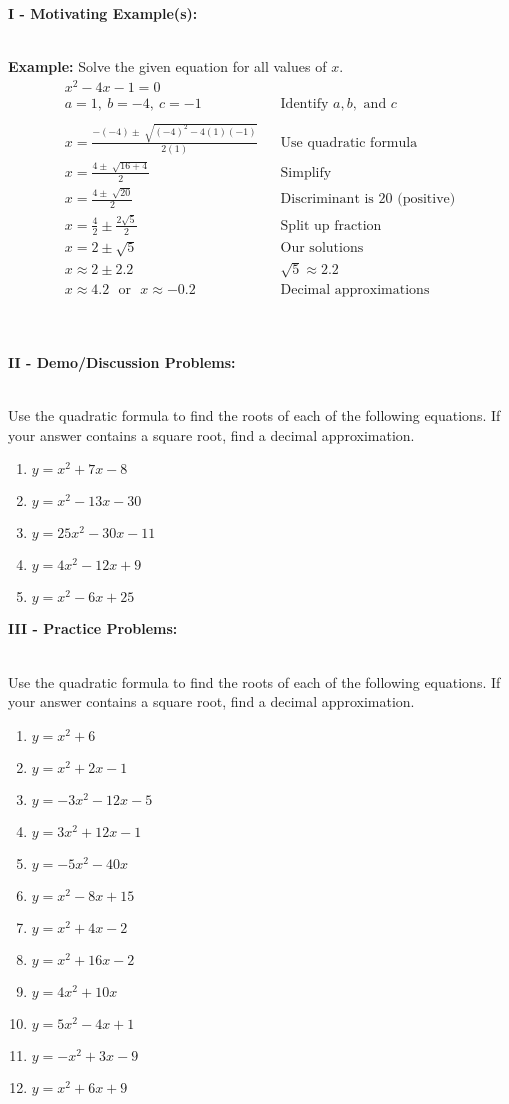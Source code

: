 \documentclass[12pt]{article}
\theoremstyle{definition}
\begin{document}
{\bf I - Motivating Example(s):}\\
\ \par
{\bf Example:}  Solve the given equation for all values of $x$.
  \begin{eqnarray*}
    x^2 - 4 x - 1 = 0 &  & \\
		a = 1,~ b = -4,~ c = -1 & & \text{Identify~} a,b, \text{~and~}c\\ 
		& & \\
    x = \frac{-(- 4) \pm \sqrt[]{(-4)^2 - 4 (1) (-1)}}{2 (1)} &  & \text{Use quadratic formula}\\
    x = \frac{4 \pm \sqrt[]{16 + 4}}{2} &  & \text{Simplify}\\
    x = \frac{4 \pm \sqrt[]{20}}{2} &  & \text{Discriminant~is~}20 \text{~(positive)}\\
	  x = \frac{4}{2} \pm \frac{2\sqrt{5}}{2} &  & \text{Split up fraction}\\
		x = 2 \pm \sqrt{5} & & \text{Our solutions}\\
    x \approx 2\pm 2.2 &  & \sqrt{5}\approx 2.2\\
    x \approx 4.2 \text{~~or~~} x\approx -0.2 &  & \text{Decimal approximations}
  \end{eqnarray*}\\
\ \par
{\bf II - Demo/Discussion Problems:}\\
\ \par
Use the quadratic formula to find the roots of each of the following equations.  If your answer contains a square root, find a decimal approximation.
\begin{enumerate}
	\item $y=x^2+7x-8$
	\item $y=x^2-13x-30$
	\item $y=25x^2-30x-11$
	\item $y=4x^2-12x+9$
	\item $y=x^2-6x+25$
\end{enumerate}
{\bf III - Practice Problems:}\\
\ \par
Use the quadratic formula to find the roots of each of the following equations.  If your answer contains a square root, find a decimal approximation.
\begin{multicols}{3}
\begin{enumerate}
  \item $y=x^2+6$
  \item $y=x^2+2x-1$
	\item $y=-3x^2-12x-5$
  \item $y=3x^2+12x-1$
  \item $y=-5x^2-40x$
  \item $y=x^2-8x+15$
  \item $y=x^2+4x-2$
  \item $y=x^2+16x-2$
  \item $y=4x^2+10x$
	\item $y=5x^2-4x+1$
	\item $y=-x^2+3x-9$
	\item $y=x^2+6x+9$
\end{enumerate}
\end{multicols}
\end{document}
